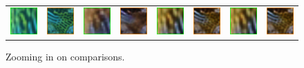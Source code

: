 \documentclass[conference,reqno]{IEEEtran}
\begin{document}
\begin{figure}
\begin{tabular}{p{1.9cm} p{1.9cm} p{1.9cm} p{1.9cm} p{1.9cm} p{1.9cm} p{1.9cm} p{1.9cm} }
   \includegraphics[width=0.8in]{flickr_crop3} &
   \includegraphics[width=0.8in]{flickr_crop4} &
   \includegraphics[width=0.8in]{cgan_crop3} &
   \includegraphics[width=0.8in]{cgan_crop4} &
   \includegraphics[width=0.8in]{ugan_crop3} &
   \includegraphics[width=0.8in]{ugan_crop4} &
   \includegraphics[width=0.8in]{ugan_crop3} &
   \includegraphics[width=0.8in]{ugan_crop4} \\

\end{tabular}
\caption{Zooming in on comparisons.}
\end{figure}
\end{document}
